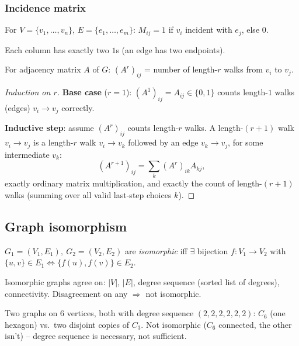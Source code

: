 \documentclass[11pt]{article}
\begin{document}
\subsubsection{Incidence matrix}
\begin{definition}
For $V=\{v_1,\dots,v_n\}$, $E=\{e_1,\dots,e_m\}$: $M_{ij}=1$ if $v_i$ incident with $e_j$, else $0$.
\end{definition}
\begin{note}
Each column has exactly two $1$s (an edge has two endpoints).
\end{note}

\begin{theorem}
For adjacency matrix $A$ of $G$: $(A^r)_{ij}$ = number of length-$r$ walks from $v_i$ to $v_j$.
\end{theorem}
\begin{proof}[Induction on $r$]
\textbf{Base case} ($r=1$): $(A^1)_{ij}=A_{ij}\in\{0,1\}$ counts length-$1$ walks (edges) $v_i\to v_j$ correctly.

\textbf{Inductive step}: assume $(A^r)_{ij}$ counts length-$r$ walks. A length-$(r{+}1)$ walk $v_i\to v_j$ is a length-$r$ walk $v_i\to v_k$ followed by an edge $v_k\to v_j$, for some intermediate $v_k$:
\[
(A^{r+1})_{ij} = \sum_k (A^r)_{ik}A_{kj},
\]
exactly ordinary matrix multiplication, and exactly the count of length-$(r{+}1)$ walks (summing over all valid last-step choices $k$).
\end{proof}

\subsection{Graph isomorphism}
\label{sec:11-4-2}

\begin{definition}[Isomorphism]
$G_1=(V_1,E_1),\ G_2=(V_2,E_2)$ are \emph{isomorphic} iff $\exists$ bijection $f:V_1\to V_2$ with $\{u,v\}\in E_1 \iff \{f(u),f(v)\}\in E_2$.
\end{definition}

\begin{note}
Isomorphic graphs agree on: $|V|$, $|E|$, degree sequence (sorted list of degrees), connectivity. Disagreement on any $\Rightarrow$ not isomorphic.
\end{note}

\begin{example}
Two graphs on $6$ vertices, both with degree sequence $(2,2,2,2,2,2)$: $C_6$ (one hexagon) vs.\ two disjoint copies of $C_3$. Not isomorphic ($C_6$ connected, the other isn't) -- degree sequence is necessary, not sufficient.
\end{example}
\end{document}
